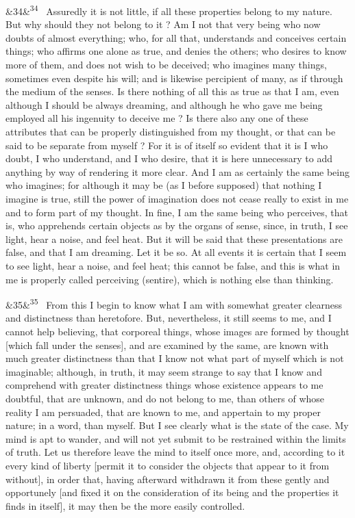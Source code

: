 \documentclass[12pt]{article}
\newcommand{\para}[1][]{\par\noindent\ifx&#1&\else\textsuperscript{\footnotesize #1}~\fi}
\begin{document}
\para[34] Assuredly it is not little, if all these properties belong to my nature. But why should they not belong to it ? Am I not that very being who now doubts of almost everything; who, for all that, understands and conceives certain things; who affirms one alone as true, and denies the others; who desires to know more of them, and does not wish to be deceived; who imagines many things, sometimes even despite his will; and is likewise percipient of many, as if through the medium of the senses. Is there nothing of all this as true as that I am, even although I should be always dreaming, and although he who gave me being employed all his ingenuity to deceive me ? Is there also any one of these attributes that can be properly distinguished from my thought, or that can be said to be separate from myself ? For it is of itself so evident that it is I who doubt, I who understand, and I who desire, that it is here unnecessary to add anything by way of rendering it more clear. And I am as certainly the same being who imagines; for although it may be (as I before supposed) that nothing I imagine is true, still the power of imagination does not cease really to exist in me and to form part of my thought. In fine, I am the same being who perceives, that is, who apprehends certain objects as by the organs of sense, since, in truth, I see light, hear a noise, and feel heat. But it will be said that these presentations are false, and that I am dreaming. Let it be so. At all events it is certain that I seem to see light, hear a noise, and feel heat; this cannot be false, and this is what in me is properly called perceiving (sentire), which is nothing else than thinking.

\para[35] From this I begin to know what I am with somewhat greater clearness and distinctness than heretofore. But, nevertheless, it still seems to me, and I cannot help believing, that corporeal things, whose images are formed by thought [which fall under the senses], and are examined by the same, are known with much greater distinctness than that I know not what part of myself which is not imaginable; although, in truth, it may seem strange to say that I know and comprehend with greater distinctness things whose existence appears to me doubtful, that are unknown, and do not belong to me, than others of whose reality I am persuaded, that are known to me, and appertain to my proper nature; in a word, than myself. But I see clearly what is the state of the case. My mind is apt to wander, and will not yet submit to be restrained within the limits of truth. Let us therefore leave the mind to itself once more, and, according to it every kind of liberty [permit it to consider the objects that appear to it from without], in order that, having afterward withdrawn it from these gently and opportunely [and fixed it on the consideration of its being and the properties it finds in itself], it may then be the more easily controlled.
\end{document}
